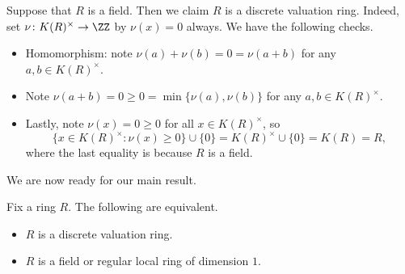\begin{example} \label{ex:fieldisdvr}
	Suppose that $R$ is a field. Then we claim $R$ is a discrete valuation ring. Indeed, set $\nu\colon K(R)^\times\to\ZZ$ by $\nu(x)=0$ always. We have the following checks.
	\begin{itemize}
		\item Homomorphism: note $\nu(a)+\nu(b)=0=\nu(a+b)$ for any $a,b\in K(R)^\times$.
		\item Note $\nu(a+b)=0\ge0=\min\{\nu(a),\nu(b)\}$ for any $a,b\in K(R)^\times$.
		\item Lastly, note $\nu(x)=0\ge0$ for all $x\in K(R)^\times$, so
		\[\{x\in K(R)^\times:\nu(x)\ge0\}\cup\{0\}=K(R)^\times\cup\{0\}=K(R)=R,\]
		where the last equality is because $R$ is a field.
	\end{itemize}
\end{example}
We are now ready for our main result.
\begin{proposition} \label{prop:dvrgrabbag}
	Fix a ring $R$. The following are equivalent.
	\begin{itemize}
		\item $R$ is a discrete valuation ring.
		\item $R$ is a field or regular local ring of dimension $1$.
	\end{itemize}
\end{proposition}
